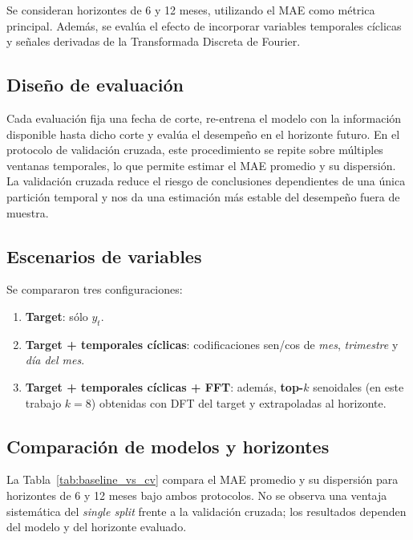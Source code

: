 \documentclass[12pt,letterpaper]{article}
\begin{document}
Se consideran horizontes de 6 y 12 meses, utilizando el MAE como métrica principal. Además, se evalúa el efecto de incorporar variables temporales cíclicas y señales derivadas de la Transformada Discreta de Fourier.

\subsection{Diseño de evaluación}

Cada evaluación fija una fecha de corte, re-entrena el modelo con la información disponible hasta dicho corte y evalúa el desempeño en el horizonte futuro. En el protocolo de validación cruzada, este procedimiento se repite sobre múltiples ventanas temporales, lo que permite estimar el MAE promedio y su dispersión. La validación cruzada reduce el riesgo de conclusiones dependientes de una única partición temporal y nos da una estimación más estable del desempeño fuera de muestra.

\subsection{Escenarios de variables}

Se compararon tres configuraciones:
\begin{enumerate}[label=\Alph*.]
    \item \textbf{Target}: sólo \(y_t\).
    \item \textbf{Target + temporales cíclicas}: codificaciones sen/cos de \emph{mes}, \emph{trimestre} y \emph{día del mes}.
    \item \textbf{Target + temporales cíclicas + FFT}: además, \textbf{top-$k$} senoidales (en este trabajo \(k=8\)) obtenidas con DFT del target y extrapoladas al horizonte.
\end{enumerate}

\subsection{Comparación de modelos y horizontes}

La Tabla~\ref{tab:baseline_vs_cv} compara el MAE promedio y su dispersión
para horizontes de 6 y 12 meses bajo ambos protocolos. No se observa una
ventaja sistemática del \textit{single split} frente a la validación cruzada;
los resultados dependen del modelo y del horizonte evaluado.
\end{document}
